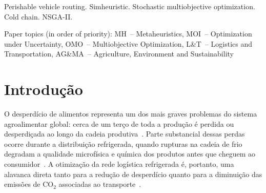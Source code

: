 \documentclass[a4paper,11pt]{article}
\begin{document}
\vspace{8mm}
\begin{abstract}
This paper defines and solves the \textit{Cold Chain VRPTW with Stochastic Temperature} (CCVRPTW-ST), a new vehicle routing problem with time windows
in cold chains where the vehicle's internal temperature is modeled as a random variable.
This problem --- not previously defined in the literature --- simultaneously minimizes distribution cost, quality loss of
perishable products (Arrhenius kinetics), and CO$_2$ emissions.
Thermal degradation is modeled by Arrhenius kinetics, and temperature
uncertainty is embedded in the NSGA-II fitness evaluations via Monte Carlo
simulation.
Fifty-four benchmark instances (Solomon methodology, C, R, and RC families,
three sizes, three uncertainty levels) were generated and tested with four
algorithmic variants.
Wilcoxon signed-rank tests ($n=270$ pairs) show that stochastic variants
significantly outperform the deterministic version ($p<0.05$), while 10 and
30 Monte Carlo replications do not differ significantly.
The $mc=10$ configuration achieves the best trade-off between Pareto front
quality and computational cost.
\end{abstract}

\bigskip
\begin{keywords}
Perishable vehicle routing. Simheuristic. Stochastic multiobjective optimization. Cold chain. NSGA-II.

\bigskip
{\sloppy\noindent Paper topics (in order of priority): MH~-- Metaheuristics, MOI~-- Optimization under Uncertainty, OMO~-- Multiobjective Optimization, L\&T~-- Logistics and Transportation, AG\&MA~-- Agriculture, Environment and Sustainability\par}
\end{keywords}

\newpage

\section{Introdução}

O desperdício de alimentos representa um dos mais graves problemas do sistema
agroalimentar global: cerca de um terço de toda a produção é perdida ou
desperdiçada ao longo da cadeia produtiva~\citep{fao:2019}.
Parte substancial dessas perdas ocorre durante a distribuição refrigerada,
quando rupturas na cadeia de frio degradam a qualidade
microfísica e química dos produtos antes que cheguem ao consumidor~\citep{hsu:2007}.
A otimização da rede logística refrigerada é, portanto, uma alavanca
direta tanto para a redução de desperdício quanto para a diminuição das
emissões de CO$_2$ associadas ao transporte~\citep{meneghetti:2021}.
\end{document}
